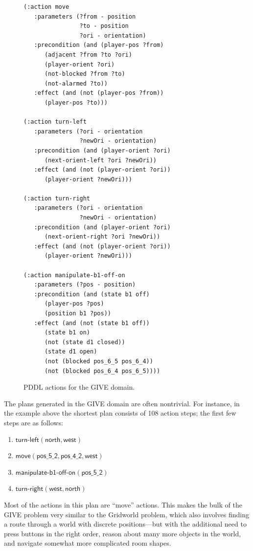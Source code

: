 \begin{figure}[t]
{\small%
\begin{verbatim}
(:action move
   :parameters (?from - position
                ?to - position
                ?ori - orientation)
   :precondition (and (player-pos ?from) 
      (adjacent ?from ?to ?ori) 
      (player-orient ?ori)
      (not-blocked ?from ?to)
      (not-alarmed ?to))
   :effect (and (not (player-pos ?from))
      (player-pos ?to)))

(:action turn-left
   :parameters (?ori - orientation
                ?newOri - orientation)
   :precondition (and (player-orient ?ori)
      (next-orient-left ?ori ?newOri))
   :effect (and (not (player-orient ?ori))
      (player-orient ?newOri)))

(:action turn-right
   :parameters (?ori - orientation
                ?newOri - orientation)
   :precondition (and (player-orient ?ori)
      (next-orient-right ?ori ?newOri))
   :effect (and (not (player-orient ?ori))
      (player-orient ?newOri)))

(:action manipulate-b1-off-on
   :parameters (?pos - position)
   :precondition (and (state b1 off)
      (player-pos ?pos)
      (position b1 ?pos))
   :effect (and (not (state b1 off))
      (state b1 on)
      (not (state d1 closed))
      (state d1 open) 
      (not (blocked pos_6_5 pos_6_4))
      (not (blocked pos_6_4 pos_6_5))))
\end{verbatim}}%
\caption{PDDL actions for the GIVE domain.}
\label{fig:give-planning}
\end{figure}

The plans generated in the GIVE domain are often nontrivial. For instance,
in the example above the shortest plan consists of 108 action steps; the
first few steps are as follows:
%
\begin{enumerate}
\item $\mathsf{turn}\textsf{-}\mathsf{left}(\mathsf{north}, \mathsf{west})$
\item $\mathsf{move}(\mathsf{pos\_5\_2}, \mathsf{pos\_4\_2}, \mathsf{west})$
\item $\mathsf{manipulate}\textsf{-}\mathsf{b1}\textsf{-}\mathsf{off}\textsf{-}\mathsf{on}(\mathsf{pos\_5\_2})$
\item $\mathsf{turn}\textsf{-}\mathsf{right}(\mathsf{west}, \mathsf{north})$
\end{enumerate}

Most of the actions in this plan are ``move'' actions.  This makes the
bulk of the GIVE problem very similar to the Gridworld problem, which
also involves finding a route through a world with discrete
positions---but with the additional need to press buttons in the right
order, reason about many more objects in the world, and navigate
somewhat more complicated room shapes.

